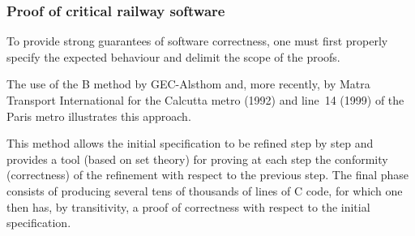 \documentclass[compress,dvipdfmx]{beamer}
\begin{document}
%








%
\begin{frame}
  \frametitle{Proof of critical railway software}

  To provide strong guarantees of software correctness, one must first
  properly specify the expected behaviour and delimit the scope of the
  proofs.

  \bigskip

  The use of the \textsf{B} method by GEC-Alsthom and, more recently,
  by Matra Transport International for the Calcutta metro (1992) and
  line~14 (1999) of the Paris metro illustrates this approach.

  \bigskip

  This method allows the initial specification to be refined step by
  step and provides a tool (based on set theory) for proving at each
  step the conformity (correctness) of the refinement with respect to
  the previous step. The final phase consists of producing several
  tens of thousands of lines of \textsf{C} code, for which one then
  has, by transitivity, a proof of correctness with respect to the
  initial specification.

\end{frame}
\end{document}
